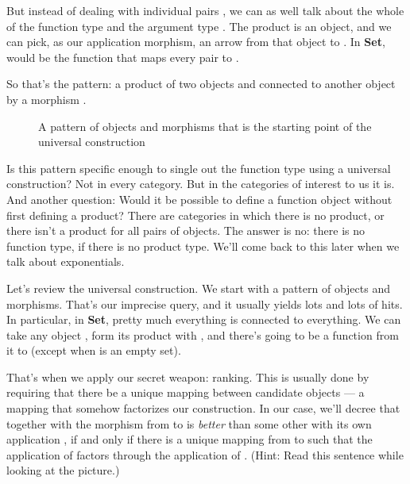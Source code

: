 But instead of dealing with individual pairs , we can as
well talk about the whole  of the function type 
and the argument type . The product  is an object,
and we can pick, as our application morphism, an arrow  from
that object to . In \textbf{Set},  would be the
function that maps every pair  to .

So that's the pattern: a product of two objects  and
 connected to another object  by a morphism
.

\begin{figure}
\centering
{}
\caption{A pattern of objects and morphisms that is the starting point of the
universal construction}
\end{figure}

Is this pattern specific enough to single out the function type using a
universal construction? Not in every category. But in the categories of
interest to us it is. And another question: Would it be possible to
define a function object without first defining a product? There are
categories in which there is no product, or there isn't a product for
all pairs of objects. The answer is no: there is no function type, if
there is no product type. We'll come back to this later when we talk
about exponentials.

Let's review the universal construction. We start with a pattern of
objects and morphisms. That's our imprecise query, and it usually yields
lots and lots of hits. In particular, in \textbf{Set}, pretty much
everything is connected to everything. We can take any object
, form its product with , and there's going to be a
function from it to  (except when  is an empty set).

That's when we apply our secret weapon: ranking. This is usually done by
requiring that there be a unique mapping between candidate objects --- a
mapping that somehow factorizes our construction. In our case, we'll
decree that  together with the morphism  from
 to  is \emph{better} than some other
 with its own application , if and
only if there is a unique mapping  from  to
 such that the application of  factors
through the application of . (Hint: Read this sentence while
looking at the picture.)

